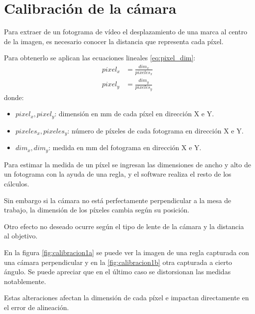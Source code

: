 \section{Calibración de la cámara} 
   Para extraer de un fotograma de vídeo el desplazamiento de una marca al centro de la imagen, es necesario conocer la distancia que representa cada píxel.\par
   Para obtenerlo se aplican las ecuaciones lineales \ref{eq:pixel_dim}:
   \begin{equation}
      \begin{aligned}
         pixel_x&=\frac{dim_x}{pixeles_x} \\
         pixel_y&=\frac{dim_y}{pixeles_y}
      \end{aligned}
      \label{eq:pixel_dim}
   \end{equation}
donde:
\begin{itemize}
   \item{$pixel_x,pixel_y$: dimensión en mm de cada píxel en dirección X e Y.}
   \item{$pixeles_x, pixeles_y$: número de píxeles de cada fotograma en dirección X e Y.}
   \item{$dim_x, dim_y$: medida en mm del fotograma en dirección X e Y.}
\end{itemize}

Para estimar la medida de un píxel se ingresan las dimensiones de ancho y alto de un fotograma con la ayuda de una regla, y el software realiza el resto de los cálculos.\par

Sin embargo si la cámara no está perfectamente perpendicular a la mesa de trabajo, la dimensión de los píxeles cambia según su posición.\par
Otro efecto no deseado ocurre según el tipo de lente de la cámara y la distancia al objetivo.\par

En la figura \ref{fig:calibracion1a} se puede ver la imagen de una regla capturada con una cámara perpendicular y en la \ref{fig:calibracion1b} otra capturada a cierto ángulo. Se puede apreciar que en el último caso se distorsionan las medidas notablemente.\par 

Estas alteraciones afectan la dimensión de cada píxel e impactan directamente en el error de alineación.\par

